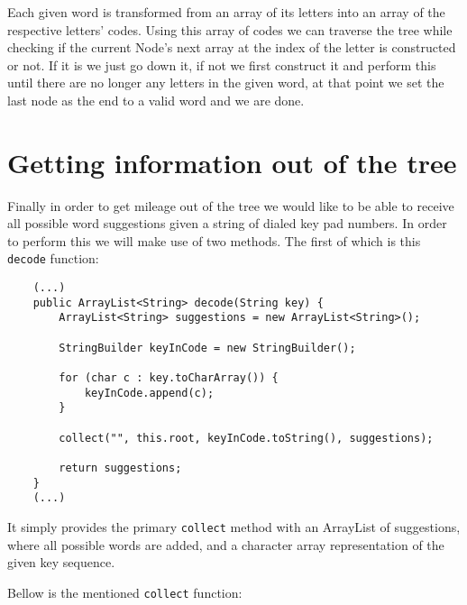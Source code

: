\documentclass[a4paper,11pt]{article}
\begin{document}
Each given word is transformed from an array of its letters into an array of the respective letters' codes. Using this array of codes we can traverse the tree while checking if the current Node's next array at the index of the letter is constructed or not. If it is we just go down it, if not we first construct it and perform this until there are no longer any letters in the given word, at that point we set the last node as the end to a valid word and we are done.

\section*{Getting information out of the tree}

Finally in order to get mileage out of the tree we would like to be able to receive all possible word suggestions given a string of dialed key pad numbers. In order to perform this we will make use of two methods. The first of which is this {\tt decode} function:

\begin{verbatim}
    (...)
    public ArrayList<String> decode(String key) {
        ArrayList<String> suggestions = new ArrayList<String>();

        StringBuilder keyInCode = new StringBuilder();

        for (char c : key.toCharArray()) {
            keyInCode.append(c);
        }

        collect("", this.root, keyInCode.toString(), suggestions);

        return suggestions;
    }
    (...)
\end{verbatim}

It simply provides the primary {\tt collect} method with an ArrayList of suggestions, where all possible words are added, and a character array representation of the given key sequence. 

Bellow is the mentioned {\tt collect} function:
\end{document}
